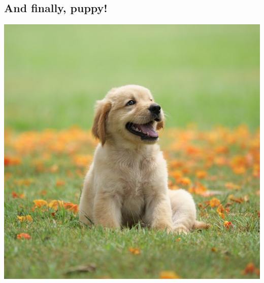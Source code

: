 \documentclass{article}
\begin{document}
\subsection{And finally, puppy!}
\includegraphics[width=\textwidth]{puppy.jpeg}
\end{document}

